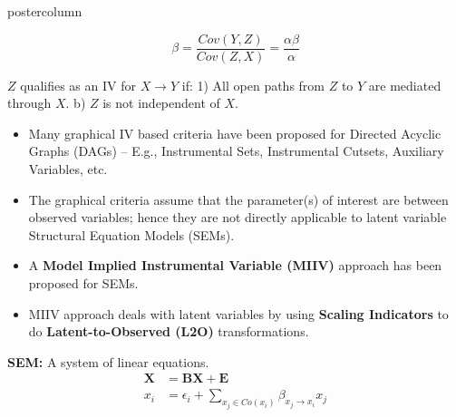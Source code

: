 \documentclass{beamer}
\begin{document}
\begin{frame}
\begin{columns}
\begin{column}{.33\textwidth}
\begin{beamercolorbox}[center]{postercolumn}
\begin{minipage}{.98\textwidth}
{\begin{myblock}{}
				\begin{figure}
					\centering
					\begin{subfigure}{0.5\linewidth}
						\centering
						\caption*{}
					\end{subfigure}%
					\begin{subfigure}{0.5\linewidth}
						\centering
						$$ \beta = \frac{Cov(Y, Z)}{Cov(Z, X)} = \frac{\alpha \beta}{\alpha}$$
						\caption*{}
					\end{subfigure}
				\end{figure}
			\vspace{-0.9em}
			$ Z $ qualifies as an IV for $ X \to Y $ if: 1)
			All open paths from $ Z $ to $ Y $ are mediated through
			$ X $. b) $ Z $ is not independent of $ X $.
		\vspace{0.9em}

		\begin{itemize}
			\item \justifying Many graphical IV based criteria have been
				proposed for Directed Acyclic Graphs (DAGs) --
				E.g., Instrumental Sets, Instrumental Cutsets,
				Auxiliary Variables, etc.
			\item \justifying The graphical criteria assume that
				the parameter(s) of interest are between
				observed variables; hence they are not directly
				applicable to latent variable Structural Equation Models (SEMs).
			\item \justifying A \textbf{Model Implied Instrumental
				Variable (MIIV)} approach has been proposed for
				SEMs.
			\item \justifying MIIV approach deals with latent
				variables by using \textbf{Scaling
				Indicators} to do \textbf{Latent-to-Observed (L2O)}
				transformations.
		\end{itemize}
	\end{myblock}\vfill
	\begin{myblock}{}
		\justifying \textbf{SEM:} A system of linear equations.
			\begin{equation*}
				\begin{split}
					\bm{X} &= \bm{BX} + \bm{E} \\
					x_i &= \epsilon_i + \sum_{x_j \in Co(x_i)} \beta_{x_j \to x_i} x_j 
				\end{split}
			\end{equation*}


\end{myblock}}
\end{minipage}
\end{beamercolorbox}
\end{column}
\end{columns}
\end{frame}
\end{document}
